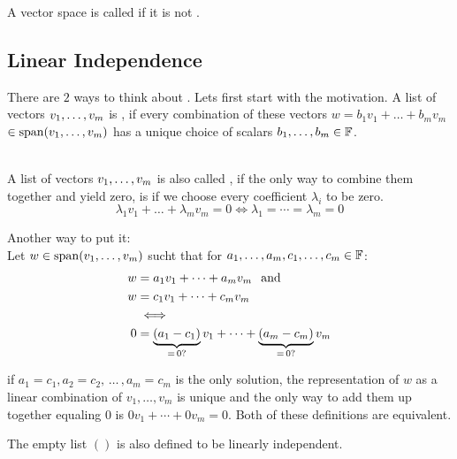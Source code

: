 \setcounter{thm}{12}
\begin{mydef}
  A vector space is called  if it is not \fd. 
\end{mydef}


\subsection{Linear Independence}

\setcounter{thm}{14}
\begin{mydef} 
  There are $2$ ways to think about . Lets first start with the motivation. A list of vectors $v_1, \dots, v_m$ is \qt{\lid}, if every combination of these vectors $w = b_1v_1 + \dots+ b_mv_m$ $\in \operatorname{span} (v_1, \dots, v_m)$ has a unique choice of scalars $b_1, \dots, b_m \in \mathbb{F}$.

   \\
  A list of vectors $v_1, \dots, v_m$ is also called \lid, if the only way to combine them together and yield zero, is if we choose every coefficient $\lambda_i$ to be zero.
  \begin{equation}
    \lambda_1v_1 + \dots + \lambda_mv_m = 0 \iff \lambda_1 = \cdots = \lambda_m = 0
  \end{equation}

  Another way to put it:\\
  Let $w\in \operatorname{span} (v_1, \dots, v_m)$ sucht that for $a_1, \dots, a_m, c_1, \dots, c_m \in \mathbb{F}$:
  \begin{equation}
    \begin{aligned}
      w & =a_1 v_1 + \cdots + a_m v_m \;\;\, \text{and}\;\; \\
      w & =c_1 v_1 + \cdots + c_m v_m \\
      & \iff \\
      0 & = \underbrace{(a_1 - c_1)}_{= \, 0\text{?}} v_1 + \cdots + \underbrace{(a_m -c_m)}_{= \, 0\text{?}} v_m
    \end{aligned}
  \end{equation}

  if $a_1 = c_1, a_2 = c_2, \, \dots \, , a_m = c_m$ is the only solution, the representation of $w$ as a linear combination of $v_1, \ldots, v_m$ is unique and the only way to add them up together equaling $0$ is $0v_1+\cdots+0v_m=0$. Both of these definitions are equivalent.

  The empty list $()$ is also defined to be linearly independent.
\end{mydef}


